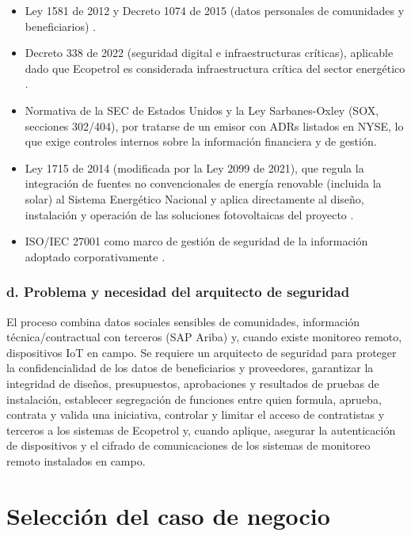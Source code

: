 \begin{itemize}
	\item Ley 1581 de 2012 y Decreto 1074 de 2015 (datos personales de comunidades y beneficiarios) \parencite{ley1581de2012,decreto1074de2015}.
	\item Decreto 338 de 2022 (seguridad digital e infraestructuras críticas), aplicable dado que Ecopetrol es considerada infraestructura crítica del sector energético \parencite{decreto338de2022}.
	\item Normativa de la SEC de Estados Unidos y la Ley Sarbanes-Oxley (SOX, secciones 302/404), por tratarse de un emisor con ADRs listados en NYSE, lo que exige controles internos sobre la información financiera y de gestión.
	\item Ley 1715 de 2014 (modificada por la Ley 2099 de 2021), que regula la integración de fuentes no convencionales de energía renovable (incluida la solar) al Sistema Energético Nacional y aplica directamente al diseño, instalación y operación de las soluciones fotovoltaicas del proyecto \parencite{ley1715de2014}.
	\item ISO/IEC 27001 como marco de gestión de seguridad de la información adoptado corporativamente \parencite{iso27001}.
\end{itemize}

\subsubsection*{d. Problema y necesidad del arquitecto de seguridad}

El proceso combina datos sociales sensibles de comunidades, información técnica/contractual con terceros (SAP Ariba) y, cuando existe monitoreo remoto, dispositivos IoT en campo. Se requiere un arquitecto de seguridad para proteger la confidencialidad de los datos de beneficiarios y proveedores, garantizar la integridad de diseños, presupuestos, aprobaciones y resultados de pruebas de instalación, establecer segregación de funciones entre quien formula, aprueba, contrata y valida una iniciativa, controlar y limitar el acceso de contratistas y terceros a los sistemas de Ecopetrol y, cuando aplique, asegurar la autenticación de dispositivos y el cifrado de comunicaciones de los sistemas de monitoreo remoto instalados en campo.

\section{Selección del caso de negocio}

